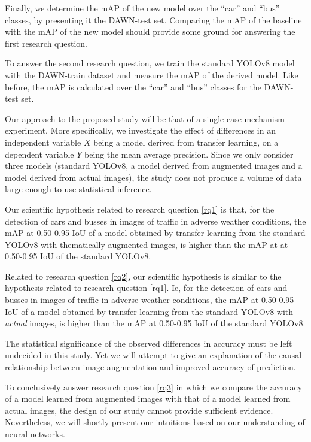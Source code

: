 \documentclass[]{article}
\begin{document}
Finally, we determine the mAP of the new model over the  ``car'' and ``bus'' classes, by presenting it the DAWN-test set. Comparing the mAP of the baseline with the mAP of the new model should provide some ground for answering the first research question.

To answer the second research question, we train the standard YOLO{\small v8} model with the DAWN-train dataset and measure the mAP of the derived model. Like before, the mAP is calculated over the ``car'' and ``bus'' classes for the DAWN-test set.




	Our approach to the proposed study will be that of a single case mechanism experiment. More specifically, we investigate the effect of differences in an independent variable $X$ being a model derived from transfer learning, on a dependent variable $Y$ being the mean average precision. Since we only consider three models (standard YOLO{\small v8}, a model derived from augmented images and a model derived from actual images), the study does not produce a volume of data large enough to use statistical inference.
	
	Our scientific hypothesis related to research question \ref{rq1} is that, for the detection of cars and busses in images of traffic in adverse weather conditions, the mAP at 0.50-0.95 IoU of a model obtained by transfer learning from the standard YOLO{\small v8} with thematically augmented images, is higher than the mAP at at 0.50-0.95 IoU of the standard YOLO{\small v8}. 	
	
	Related to research question \ref{rq2}, our scientific hypothesis is similar to the hypothesis related to research question \ref{rq1}. Ie, for the detection of cars and busses in images of traffic in adverse weather conditions, the mAP at 0.50-0.95 IoU of a model obtained by transfer learning from the standard YOLO{\small v8} with  \textit{actual} images, is higher than the mAP at 0.50-0.95 IoU of the standard YOLO{\small v8}.  
	
	The statistical significance of the observed differences in accuracy must be left undecided in this study. Yet we will attempt to give an explanation of the causal relationship between image augmentation and improved accuracy of prediction.
	
	To conclusively answer research question \ref{rq3} in which we compare the accuracy of a model learned from augmented images with that of a model learned from actual images, the design of our study cannot provide sufficient evidence. Nevertheless, we will shortly present our intuitions based on our understanding of neural networks.
	
\end{document}
